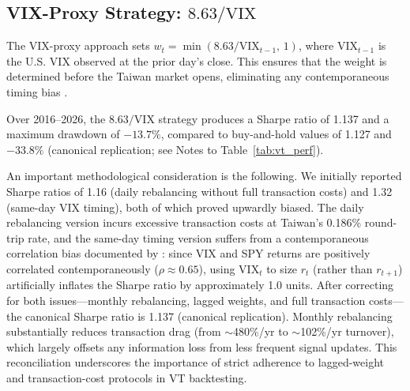 \subsection{VIX-Proxy Strategy: $8.63/\text{VIX}$}

The VIX-proxy approach sets $w_t = \min(8.63/\text{VIX}_{t-1}, \, 1)$, where $\text{VIX}_{t-1}$ is the U.S. VIX observed at the prior day's close. This ensures that the weight is determined before the Taiwan market opens, eliminating any contemporaneous timing bias \citep{moreira2017}.

Over 2016--2026, the $8.63/\text{VIX}$ strategy produces a Sharpe ratio of 1.137 and a maximum drawdown of $-13.7\%$, compared to buy-and-hold values of 1.127 and $-33.8\%$ (canonical replication; see Notes to Table~\ref{tab:vt_perf}).%

An important methodological consideration is the following. We initially reported Sharpe ratios of 1.16 (daily rebalancing without full transaction costs) and 1.32 (same-day VIX timing), both of which proved upwardly biased. The daily rebalancing version incurs excessive transaction costs at Taiwan's 0.186\% round-trip rate, and the same-day timing version suffers from a contemporaneous correlation bias documented by \citet{moreira2017}: since VIX and SPY returns are positively correlated contemporaneously ($\rho \approx 0.65$), using $\text{VIX}_t$ to size $r_t$ (rather than $r_{t+1}$) artificially inflates the Sharpe ratio by approximately 1.0 units. After correcting for both issues---monthly rebalancing, lagged weights, and full transaction costs---the canonical Sharpe ratio is 1.137 (canonical replication). Monthly rebalancing substantially reduces transaction drag (from $\sim$480\%/yr to $\sim$102\%/yr turnover), which largely offsets any information loss from less frequent signal updates. This reconciliation underscores the importance of strict adherence to lagged-weight and transaction-cost protocols in VT backtesting.

